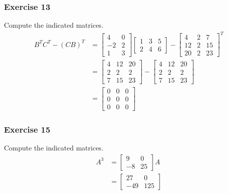 \documentclass{math}
\begin{document}
\subsubsection*{Exercise 13}
Compute the indicated matrices.
\begin{align*}
  B^TC^T-(CB)^T &= \begin{bmatrix}
    4 & 0 \\
    -2 & 2 \\
    1 & 3
  \end{bmatrix}\begin{bmatrix}
    1 & 3 & 5 \\
    2 & 4 & 6
  \end{bmatrix}-\begin{bmatrix}
    4 & 2 & 7 \\
    12 & 2 & 15 \\
    20 & 2 & 23
  \end{bmatrix}^T \\
  &= \begin{bmatrix}
    4 & 12 & 20 \\
    2 & 2 & 2 \\
    7 & 15 & 23
  \end{bmatrix}-\begin{bmatrix}
    4 & 12 & 20 \\
    2 & 2 & 2 \\
    7 & 15 & 23
  \end{bmatrix} \\
  &= \begin{bmatrix}
    0 & 0 & 0 \\
    0 & 0 & 0 \\
    0 & 0 & 0
  \end{bmatrix}
\end{align*}

\subsubsection*{Exercise 15}
Compute the indicated matrices.
\begin{align*}
  A^3 &= \begin{bmatrix}
    9 & 0 \\
    -8 & 25
  \end{bmatrix}A \\
  &= \begin{bmatrix}
    27 & 0 \\
    -49 & 125
  \end{bmatrix}
\end{align*}
\end{document}
